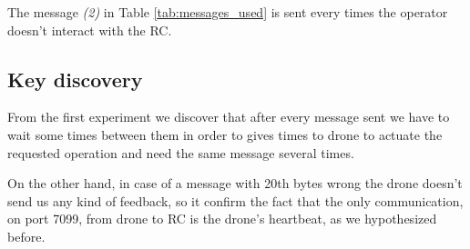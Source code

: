 \begin{enumerate}
The message \textit{(2)} in Table \ref{tab:messages_used} is sent every times the operator doesn't interact with the RC.

\subsection*{Key discovery}
From the first experiment we discover that after every message sent we have to wait some times between them in order to gives times to drone to actuate the requested operation and need the same message several times.

On the other hand, in case of a message with 20th bytes wrong the drone doesn't send us any kind of feedback, so it confirm the fact that the only communication, on port 7099, from drone to RC is the drone's heartbeat, as we hypothesized before.
\end{enumerate}
